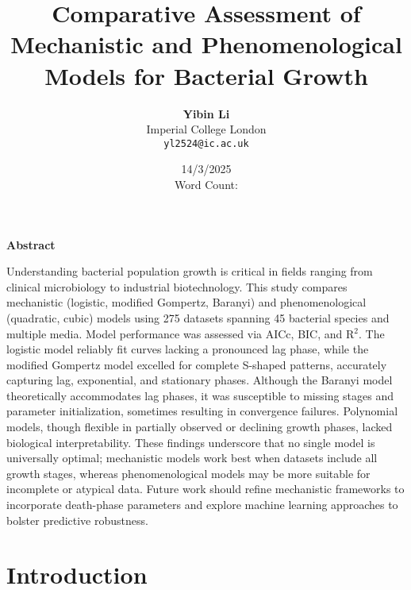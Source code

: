 \documentclass{article}
\newcommand{\wordcount}{}
\begin{document}
\title{\textbf{\Huge Comparative Assessment of Mechanistic and Phenomenological Models for Bacterial Growth}}
\vspace{10cm} 
\author{\textbf{Yibin Li} \\
Imperial College London \\
\texttt{yl2524@ic.ac.uk}
}

\date{14/3/2025 \\Word Count: \wordcount}
\maketitle



             
\newpage

                                               



\begin{center}

    \textbf{\LARGE Abstract}

\end{center}


Understanding bacterial population growth is critical in fields ranging from clinical microbiology to industrial biotechnology. This study compares mechanistic (logistic, modified Gompertz, Baranyi) and phenomenological (quadratic, cubic) models using 275 datasets spanning 45 bacterial species and multiple media. Model performance was assessed via AICc, BIC, and R$^2$. The logistic model reliably fit curves lacking a pronounced lag phase, while the modified Gompertz model excelled for complete S-shaped patterns, accurately capturing lag, exponential, and stationary phases. Although the Baranyi model theoretically accommodates lag phases, it was susceptible to missing stages and parameter initialization, sometimes resulting in convergence failures. Polynomial models, though flexible in partially observed or declining growth phases, lacked biological interpretability. These findings underscore that no single model is universally optimal; mechanistic models work best when datasets include all growth stages, whereas phenomenological models may be more suitable for incomplete or atypical data. Future work should refine mechanistic frameworks to incorporate death-phase parameters and explore machine learning approaches to bolster predictive robustness.


\newpage

\section{Introduction}
\end{document}

